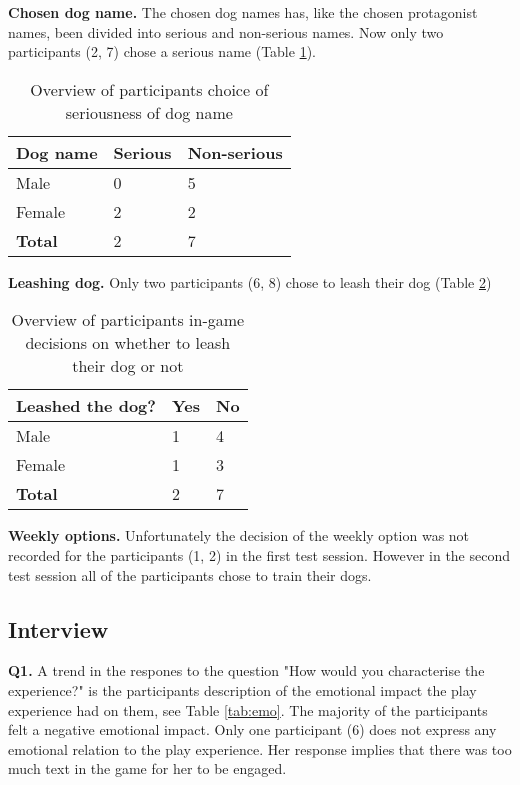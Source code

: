\textbf{Chosen dog name.} The chosen dog names has, like the chosen protagonist names, been divided into serious and non-serious names. Now only two participants (2, 7) chose a serious name (Table \ref{tab:dame}). 

\begin{table}[h]
\centering
\begin{tabular}{l l l}
\hline
\textbf{Dog name} & Serious & Non-serious \\
\hline
Male & 0 & 5 \\
Female & 2 & 2 \\
\textbf{Total} & 2 & 7 \\
\hline
\end{tabular}
\caption{\label{tab:dame}Overview of participants choice of seriousness of dog name}
\end{table}


\textbf{Leashing dog.} Only two participants (6, 8) chose to leash their dog (Table \ref{tab:leas})

\begin{table}[h]
\centering
\begin{tabular}{l l l}
\hline
\textbf{Leashed the dog?} & Yes & No \\
\hline
Male & 1 & 4 \\
Female & 1 & 3 \\
\textbf{Total} & 2 & 7 \\
\hline
\end{tabular}
\caption{\label{tab:leas}Overview of participants in-game decisions on whether to leash their dog or not}
\end{table}


\textbf{Weekly options.} Unfortunately the decision of the weekly option was not recorded for the participants (1, 2) in the first test session. However in the second test session all of the participants chose to train their dogs.


\subsection{Interview} \label{interview}
\textbf{Q1.} A trend in the respones to the question "How would you characterise the experience?" is the participants description of the emotional impact the play experience had on them, see Table \ref{tab:emo}. The majority of the participants felt a negative emotional impact. Only one participant (6) does not express any emotional relation to the play experience. Her response implies that there was too much text in the game for her to be engaged.

